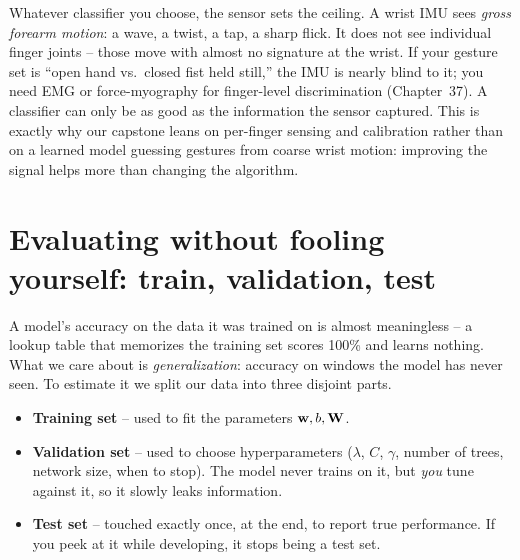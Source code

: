 \begin{goalbox}
Whatever classifier you choose, the sensor sets the ceiling. A wrist IMU sees \emph{gross
forearm motion}: a wave, a twist, a tap, a sharp flick. It does not see individual finger
joints -- those move with almost no signature at the wrist. If your gesture set is ``open
hand vs.\ closed fist held still,'' the IMU is nearly blind to it; you need EMG or
force-myography for finger-level discrimination (Chapter~37). A classifier
can only be as good as the information the sensor captured. This is exactly why our
capstone leans on per-finger sensing and calibration rather than on a learned model
guessing gestures from coarse wrist motion: improving the signal helps more than
changing the algorithm.
\end{goalbox}

\section{Evaluating without fooling yourself: train, validation, test}
\label{ch39:eval}

A model's accuracy on the data it was trained on is almost meaningless -- a lookup table
that memorizes the training set scores 100\% and learns nothing. What we care about is
\emph{generalization}: accuracy on windows the model has never seen. To estimate it we
split our data into three disjoint parts.

\begin{itemize}
  \item \textbf{Training set} -- used to fit the parameters $\mathbf{w},b,\mathbf{W}$.
  \item \textbf{Validation set} -- used to choose hyperparameters ($\lambda$, $C$,
        $\gamma$, number of trees, network size, when to stop). The model never trains on
        it, but \emph{you} tune against it, so it slowly leaks information.
  \item \textbf{Test set} -- touched exactly once, at the end, to report true
        performance. If you peek at it while developing, it stops being a test set.
\end{itemize}

